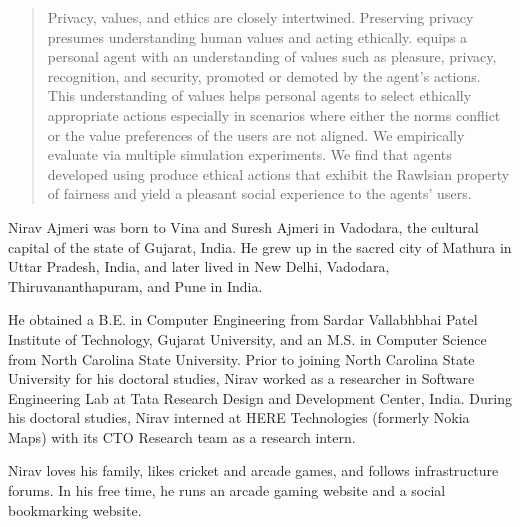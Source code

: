 \begin{abstract}
Privacy, values, and ethics are closely intertwined. Preserving privacy presumes  understanding human values and acting ethically. \frameworkAinur equips a personal agent with an understanding of values such as pleasure, privacy, recognition, and security, promoted or demoted by the agent's actions. This understanding of values helps personal agents to select ethically appropriate actions especially in scenarios where either the norms conflict or the value preferences of the users are not aligned.  We empirically evaluate \frameworkAinur via multiple simulation experiments. We find that agents developed using \frameworkAinur produce ethical actions that exhibit the Rawlsian property of fairness and yield a pleasant social experience to the agents' users.
\end{abstract}


\makecopyrightpage

\maketitlepage

\begin{dedication}
  \centering 
\end{dedication}

\begin{biography}
Nirav Ajmeri was born to Vina and Suresh Ajmeri in Vadodara, the cultural capital of the state of Gujarat, India. He grew up in the sacred city of Mathura in Uttar Pradesh, India, and later lived in New Delhi, Vadodara, Thiruvananthapuram, and Pune in India. 

He obtained a B.E. in Computer Engineering from Sardar Vallabhbhai Patel Institute of Technology, Gujarat University, 
and an M.S. in Computer Science from North Carolina State University. 
Prior to joining North Carolina State University for his doctoral studies, Nirav worked as a researcher in Software Engineering Lab at Tata Research Design and Development Center, India. During his doctoral studies, Nirav interned at HERE Technologies (formerly Nokia Maps) with its CTO Research team as a research intern. 

Nirav loves his family, likes cricket and arcade games, and follows infrastructure forums. 
In his free time, he runs an arcade gaming website and a social bookmarking website. 
\end{biography}

